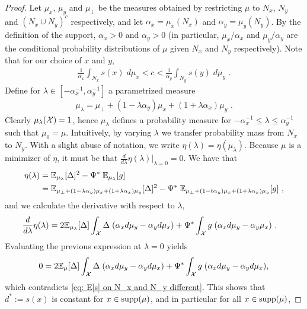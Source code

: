 \begin{proof}
	Let $\mu_x$, $\mu_y$ and $\mu_\bot$ be the measures obtained by restricting $\mu$ to $N_x$, $N_y$ and $(N_x \cup N_y)^c$ respectively, and let $\alpha_x = \mu_x(N_x)$ and $\alpha_y = \mu_y(N_y)$. By the definition of the support, $\alpha_x > 0$ and $\alpha_y > 0$ (in particular, $\mu_x/\alpha_x$ and $\mu_y/\alpha_y$ are the conditional probability distributions of $\mu$ given $N_x$ and $N_y$ respectively). Note that for our choice of $x$ and $y$,
	\begin{align}
	\frac{1}{\alpha_x}	\int_{N_x} s(x)\; d\mu_x < c  < \frac{1}{\alpha_y} \int_{N_y} s(y)\; d\mu_y \text{ .}\label{eq: E[s] on N_x and N_y different}
	\end{align}
	Define for $\lambda \in [-\alpha_x^{-1}, \alpha_y^{-1}]$ a parametrized measure
	\begin{align*}
	\mu_\lambda = \mu_\bot + (1 - \lambda \alpha_y) \mu_x + (1+ \lambda \alpha_x)\mu_y \text{ .}
	\end{align*}
	Clearly $\mu_\lambda(\mathcal{X}) = 1$, hence $\mu_\lambda$ defines a probability measure for $-\alpha_x^{-1} \leq \lambda \leq \alpha_y^{-1}$ such that $\mu_0 = \mu$. Intuitively, by varying $\lambda$ we transfer probability mass from $N_x$ to $N_y$. With a slight abuse of notation, we write $\eta(\lambda) = \eta(\mu_\lambda)$. Because $\mu$ is a minimizer of $\eta$, it must be that $\frac{d}{d\lambda}\eta(\lambda)|_{\lambda=0} = 0$. We have that
	\begin{align*}
	\eta(\lambda) &= \mathbb{E}_{\mu_\lambda}[\Delta]^2 - \Psi^*\;\mathbb{E}_{\mu_\lambda}[g] \\
	&= \mathbb{E}_{\mu_\bot + (1- \lambda\alpha_y) \mu_x + (1 + \lambda\alpha_x)\mu_y}[\Delta]^2  - \Psi^* \; \mathbb{E}_{\mu_\bot + (1- t\alpha_y) \mu_x +  (1 + \lambda\alpha_x)\mu_y} [g] \text{ ,}
	\end{align*}
	and we calculate the derivative with respect to $\lambda$,
	\begin{align*}
	\frac{d}{d\lambda}\eta(\lambda) &= 2 \mathbb{E}_{\mu_\lambda}[\Delta] \int_{\mathcal{X}} \Delta \; (\alpha_x d\mu_y - \alpha_yd\mu_x) + \Psi^* \int_{\mathcal{X}} g\; (\alpha_x d\mu_y - \alpha_y \mu_x) \text{ .}
	\end{align*}
	Evaluating the previous expression at $\lambda=0$ yields
	\begin{align*}
	0 = 2 \mathbb{E}_{\mu}[\Delta] \int_{\mathcal{X}} \Delta \; (\alpha_x d\mu_y - \alpha_y  d\mu_x ) + \Psi^* \int_{\mathcal{X}} g\; (\alpha_x d\mu_y - \alpha_y d\mu_x) \text{,}
	\end{align*}
	which contradicts \eqref{eq: E[s] on N_x and N_y different}. This shows that $d^* := s(x)$ is constant for $x \in \text{supp}(\mu)$, and in particular for all $x \in \text{supp}(\mu)$,

\end{proof}
